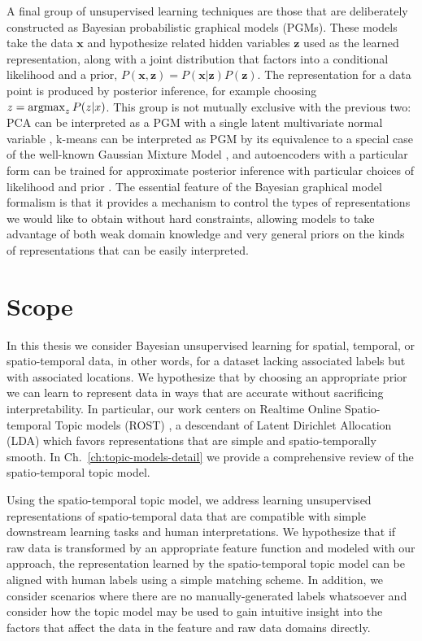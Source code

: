 A final group of unsupervised learning techniques are those that are deliberately constructed as Bayesian probabilistic graphical models (PGMs). These models take the data $\textbf{x}$ and hypothesize related hidden variables $\textbf{z}$ used as the learned representation, along with a joint distribution that factors into a conditional likelihood and a prior, $P(\textbf{x}, \textbf{z}) = P(\textbf{x}|\textbf{z}) P(\textbf{z})$. The representation for a data point is produced by posterior inference, for example choosing $z = \operatorname*{argmax}_z P(z | x)$. This group is not mutually exclusive with the previous two: PCA can be interpreted as a PGM with a single latent multivariate normal variable \citep{Bishop1999}, k-means can be interpreted as PGM by its equivalence to a special case of the well-known Gaussian Mixture Model  \citep{BishopCh9}, and autoencoders with a particular form can be trained for approximate posterior inference with particular choices of likelihood and prior \citep{Kingma2014}. The essential feature of the Bayesian graphical model formalism is that it provides a mechanism to control the types of representations we would like to obtain without hard constraints, allowing models to take advantage of both weak domain knowledge and very general priors on the kinds of representations that can be easily interpreted.

\section{Scope}
In this thesis we consider Bayesian unsupervised learning for spatial, temporal, or spatio-temporal data, in other words, for a dataset lacking associated labels but with associated locations. We hypothesize that by choosing an appropriate prior we can learn to represent data in ways that are accurate without sacrificing interpretability. In particular, our work centers on Realtime Online Spatio-temporal Topic models (ROST) \citep{Girdhar2014}, a descendant of Latent Dirichlet Allocation (LDA) \citep{Blei2003} which favors representations that are simple and spatio-temporally smooth. In Ch.~\ref{ch:topic-models-detail} we provide a comprehensive review of the spatio-temporal topic model.

Using the spatio-temporal topic model, we address learning unsupervised representations of spatio-temporal data that are compatible with simple downstream learning tasks and human interpretations. We hypothesize that if raw data is transformed by an appropriate feature function and modeled with our approach, the representation learned by the spatio-temporal topic model can be aligned with human labels using a simple matching scheme. In addition, we consider scenarios where there are no manually-generated labels whatsoever and consider how the topic model may be used to gain intuitive insight into the factors that affect the data in the feature and raw data domains directly.

